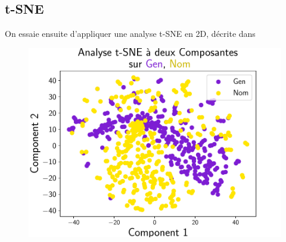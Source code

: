 \documentclass{cours}
\begin{document}
\subsection{t-SNE}
    On essaie ensuite d'appliquer une analyse t-SNE en 2D, décrite dans~\cite{tSNE}
    \begin{figure}[H]
        \begin{center}
            \begin{minipage}{.5\textwidth}
                \begin{center}
                    \includegraphics[width=\linewidth]{Figures/Visualisations/tsne_Gen_Nom.pdf}
                \end{center}
            \end{minipage}
        \end{center}


\end{figure}
\end{document}
